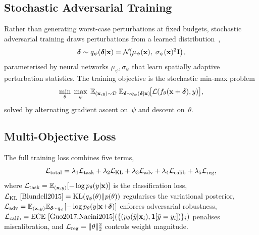 \subsection{Stochastic Adversarial Training}

Rather than generating worst-case perturbations at fixed budgets, stochastic adversarial training draws perturbations from a learned distribution~\cite{Madry2018,Zhang2019trades,Shafahi2019},
\begin{equation}
\boldsymbol{\delta}\sim q_\psi(\boldsymbol{\delta}|\mathbf{x})
= \mathcal{N}\!\bigl(\mu_\psi(\mathbf{x}),\;\sigma_\psi(\mathbf{x})^2\mathbf{I}\bigr),
\label{eq:stoch_pert_dist}
\end{equation}
parameterised by neural networks $\mu_\psi,\sigma_\psi$ that learn spatially adaptive perturbation statistics. The training objective is the stochastic min-max problem
\begin{equation}
\min_\theta\;\max_\psi\;
\mathbb{E}_{(\mathbf{x},y)\sim\mathcal{D}}\;
\mathbb{E}_{\boldsymbol{\delta}\sim q_\psi(\boldsymbol{\delta}|\mathbf{x})}\!
\bigl[\mathcal{L}(f_\theta(\mathbf{x}+\boldsymbol{\delta}),y)\bigr],
\label{eq:stoch_adv_obj}
\end{equation}
solved by alternating gradient ascent on~$\psi$ and descent on~$\theta$.

\subsection{Multi-Objective Loss}

The full training loss combines five terms,
\begin{equation}
\mathcal{L}_{\mathrm{total}}
= \lambda_1\mathcal{L}_{\mathrm{task}}
+ \lambda_2\mathcal{L}_{\mathrm{KL}}
+ \lambda_3\mathcal{L}_{\mathrm{adv}}
+ \lambda_4\mathcal{L}_{\mathrm{calib}}
+ \lambda_5\mathcal{L}_{\mathrm{reg}},
\label{eq:stoch_total_loss}
\end{equation}
where $\mathcal{L}_{\mathrm{task}}=\mathbb{E}_{(\mathbf{x},y)}[-\log p_\theta(y|\mathbf{x})]$ is the classification loss, $\mathcal{L}_{\mathrm{KL}}~\cite{Blundell2015}=\mathrm{KL}(q_\phi(\theta)\|p(\theta))$ regularises the variational posterior, $\mathcal{L}_{\mathrm{adv}}=\mathbb{E}_{(\mathbf{x},y)}\mathbb{E}_{\boldsymbol{\delta}\sim q_\psi}[-\log p_\theta(y|\mathbf{x}{+}\boldsymbol{\delta})]$ enforces adversarial robustness, $\mathcal{L}_{\mathrm{calib}}=\mathrm{ECE}~\cite{Guo2017,Naeini2015}(\{(p_\theta(\hat{y}|\mathbf{x}_i),\mathbf{1}[\hat{y}=y_i])\}_i)$ penalises miscalibration, and $\mathcal{L}_{\mathrm{reg}}=\|\theta\|_2^2$ controls weight magnitude.


